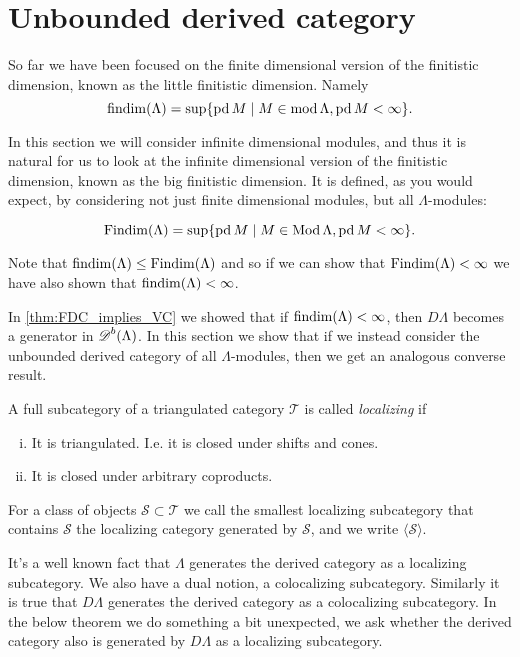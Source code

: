 \section{Unbounded derived category}\label{sec:Unbounded_derived_category}

So far we have been focused on the finite dimensional version of the finitistic dimension, known as the little finitistic dimension. Namely 
$$\operatorname{findim}(\Lambda) = \sup\{\operatorname{pd} M \mid M \in \operatorname{mod}\Lambda, \operatorname{pd} M < \infty\}.$$

In this section we will consider infinite dimensional modules, and thus it is natural for us to look at the infinite dimensional version of the finitistic dimension, known as the big finitistic dimension. It is defined, as you would expect, by considering not just finite dimensional modules, but all $\Lambda$-modules:

$$\operatorname{Findim}(\Lambda) = \sup\{\operatorname{pd} M \mid M \in \operatorname{Mod}\Lambda, \operatorname{pd} M < \infty\}.$$

Note that $\operatorname{findim}(\Lambda) \leq \operatorname{Findim}(\Lambda)$ and so if we can show that $\operatorname{Findim}(\Lambda) < \infty$ we have also shown that $\operatorname{findim}(\Lambda) < \infty$.

In \cref{thm:FDC_implies_VC} we showed that if $\operatorname{findim}(\Lambda) < \infty$, then $D\Lambda$ becomes a generator in $\operatorname{\mathscr{D}}^b(\Lambda)$. In this section we show that if we instead consider the unbounded derived category of all $\Lambda$-modules, then we get an analogous converse result.

\begin{defn}
	A full subcategory of a triangulated category $\mathcal T$ is called \emph{localizing} if
	\begin{enumerate}[i)]
		\item It is triangulated. I.e. it is closed under shifts and cones.
		\item It is closed under arbitrary coproducts.
	\end{enumerate}
	For a class of objects $\mathcal S \subset \mathcal T$ we call the smallest localizing subcategory that contains $\mathcal S$ the localizing category generated by $\mathcal S$, and we write $\langle \mathcal S \rangle$.
\end{defn}

It's a well known fact that $\Lambda$ generates the derived category as a localizing subcategory. We also have a dual notion, a colocalizing subcategory. Similarly it is true that $D\Lambda$ generates the derived category as a colocalizing subcategory. In the below theorem we do something a bit unexpected, we ask whether the derived category also is generated by $D\Lambda$ as a localizing subcategory.

